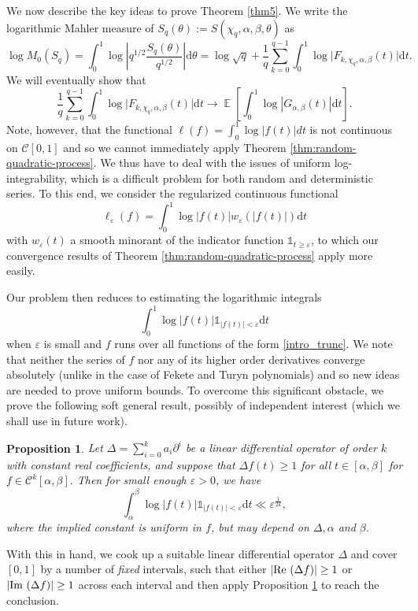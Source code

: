 \documentclass[12pt, a4paper]{amsart}
\newtheorem{proposition}{Proposition}
\theoremstyle{remark}
\newcommand{\ud}{\mathrm{d}}
\newcommand{\abs}[1]{\left|#1\right|}
\renewcommand{\Re}{\textup{Re }} %
\renewcommand{\Im}{\textup{Im }}
\DeclareMathOperator{\E}{\mathbb{E}}
\begin{document}
We now describe the key ideas to prove Theorem \ref{thm5}.
We write the logarithmic Mahler measure of $S_q(\theta) := S(\chi_q, \alpha, \beta, \theta)$ as
\[
    \log M_0(S_q)=\int_0^1\log \abs{q^{1/2} \frac{S_q(\theta)}{q^{1/2}}} \ud \theta
    = \log \sqrt{q} + \frac 1q \sum_{k=0}^{q-1} 
    \int_0^1 \log \bigg| F_{k, \chi_q,\alpha,\beta}(t) \bigg| \ud t.
\]
We will eventually show that
\[
    \frac 1q \sum_{k=0}^{q-1} 
    \int_0^1 \log \bigg| F_{k, \chi_q,\alpha,\beta}(t) \bigg| \ud t
        \longrightarrow 
        \E\left[\int_0^1 \log\abs{G_{\alpha,\beta}(t)} \ud t\right].
\]
Note, however, that the functional $\ell(f)=\int_{0}^1\log |f(t)|dt$ is not
continuous on $\mathscr C[0,1]$ and so we cannot immediately apply Theorem
\ref{thm:random-quadratic-process}.
We thus have to deal with the issues of uniform log-integrability, which is
a difficult problem for both random and deterministic series.
To this end, we consider the regularized continuous functional
$$\ell_{\varepsilon}(f)=\int_{0}^{1}\log \abs{f(t)}w_{\varepsilon}(\abs{f(t)})\ud t$$ with $w_{\varepsilon}(t)$ a smooth minorant of the indicator function $\mathds 1_{t\geq\varepsilon}$, to which our convergence results of Theorem
\ref{thm:random-quadratic-process} apply more easily.

Our problem then reduces to estimating the logarithmic integrals $$\int_0^1
\log\lvert f(t)\rvert\mathds1_{\lvert f(t)\rvert<\varepsilon}\text{d} t$$
when $\varepsilon$
is small and $f$ runs over all functions of the form \eqref{intro_trunc}. We
note that neither the series of $f$ nor any of its higher order derivatives
converge absolutely (unlike in the case of Fekete and Turyn polynomials)
and so new ideas are needed to prove uniform bounds. To overcome this significant obstacle, we prove the following soft general result,
possibly of independent interest (which we shall use in future work).
\begin{proposition}
\label{prop:intro_logThm}
    Let $\Delta = \sum_{i=0}^k a_i \partial^i$ be a linear differential operator of order $k$ with constant real coefficients, and suppose that $\Delta f(t)\geq 1$ for all $t\in[\alpha, \beta]$ for $f\in\mathscr C^{k}[\alpha,\beta].$ Then for small enough $\varepsilon>0$, we have
    \begin{equation*}
        \int_{\alpha}^{\beta} \log\lvert f(t)\rvert \mathds1_{\lvert f(t)\rvert<\varepsilon}\ud t \ll \varepsilon^{\frac{1}{2k}},
    \end{equation*}
    where the implied constant is uniform in $f$, but may depend on $\Delta, \alpha$ and $\beta$. 
\end{proposition}
With this in hand, we cook up a suitable linear differential operator $\Delta$
and cover $[0,1]$ by a number of {\it fixed} intervals, such that
 either $|\Re(\Delta f)| \ge 1$ or
$ |\Im(\Delta f)|\ge 1$ across each interval and then apply Proposition
\ref{prop:intro_logThm} to reach the conclusion.
 
\end{document}
